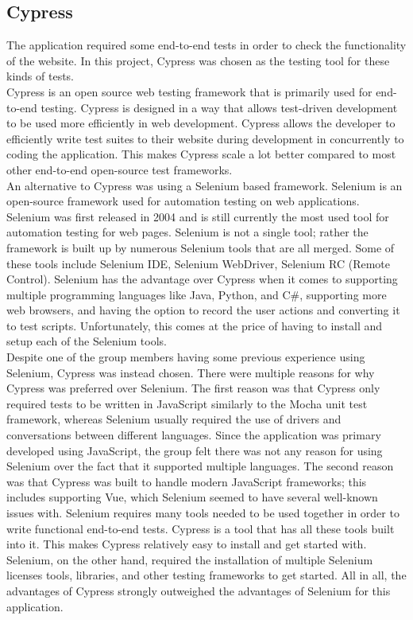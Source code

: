 \subsection{Cypress}
The application required some end-to-end tests in order to check the functionality of the website. In this project, Cypress was chosen as the testing tool for these kinds of tests.
\\[11pt]
Cypress\cite{Cypress:MainPage,Cypress:howItWorks} is an open source web testing framework that is primarily used for end-to-end testing. Cypress is designed in a way that allows test-driven development to be used more efficiently in web development. Cypress allows the developer to efficiently write test suites to their website during development in concurrently to coding the application. This makes Cypress scale a lot better compared to most other end-to-end open-source test frameworks.
\\[11pt]
An alternative to Cypress was using a Selenium based framework. Selenium\cite{Selenium:Intro,Selenium:Wiki} is an open-source framework used for automation testing on web applications. Selenium was first released in 2004 and is still currently the most used tool for automation testing for web pages. Selenium is not a single tool; rather the framework is built up by numerous Selenium tools that are all merged. Some of these tools include Selenium IDE, Selenium WebDriver, Selenium RC (Remote Control). Selenium has the advantage over Cypress when it comes to supporting multiple programming languages like Java, Python, and C\#, supporting more web browsers, and having the option to record the user actions and converting it to test scripts. Unfortunately, this comes at the price of having to install and setup each of the Selenium tools.
\\[11pt]
Despite one of the group members having some previous experience using Selenium, Cypress was instead chosen. There were multiple reasons for why Cypress was preferred over Selenium. The first reason was that Cypress only required tests to be written in JavaScript similarly to the Mocha unit test framework, whereas Selenium usually required the use of drivers and conversations between different languages. Since the application was primary developed using JavaScript, the group felt there was not any reason for using Selenium over the fact that it supported multiple languages. The second reason was that Cypress was built to handle modern JavaScript frameworks; this includes supporting Vue, which Selenium seemed to have several well-known issues with. Selenium requires many tools needed to be used together in order to write functional end-to-end tests. Cypress is a tool that has all these tools built into it. This makes Cypress relatively easy to install and get started with. Selenium, on the other hand, required the installation of multiple Selenium licenses tools, libraries, and other testing frameworks to get started. All in all, the advantages of Cypress strongly outweighed the advantages of Selenium for this application.\cite{CypressVsSelenium}